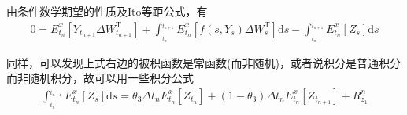 			由条件数学期望的性质及Ito等距公式，有
			\begin{align*}
			0 = E_{{t_n}}^x[ {{Y_{{t_{n + 1}}}}  \Delta W_{{t_{n + 1}}}^\mathrm{T}} ] + \int_{_{{t_n}}}^{_{{t_{n + 1}}}} {E_{{t_n}}^x[ {f( {s,{Y_s}} ) \Delta W_{s}^\mathrm{T}} ]\mathrm{d}s}  - \int_{_{{t_n}}}^{_{{t_{n + 1}}}} {E_{{t_n}}^x[ {{Z_s} } ]\mathrm{d}s}
			\end{align*}
			\par
			同样，可以发现上式右边的被积函数是常函数(而非随机)，或者说积分是普通积分而非随机积分，故可以用一些积分公式
			\begin{align*}
			\int_{_{{t_n}}}^{_{{t_{n + 1}}}} {E_{{t_n}}^x[ {{Z_s}} ]\mathrm{d}s}  = {\theta _3}\Delta {t_n}E_{{t_n}}^x[ {{Z_{{t_n}}}} ] + ( {1 - {\theta _3}} )\Delta {t_n}E_{{t_n}}^x[ {{Z_{{t_{n + 1}}}}} ] + R_{{z_1}}^n
			\end{align*}



